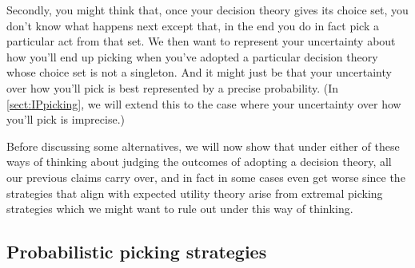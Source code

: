 \documentclass[a4paper]{article}
\newcommand\Exp{\mathsf{Exp}}
\newcommand\U{\mathfrak{U}} %
\newcommand{\n}{\mathsf{n}}
\newcommand{\todoold}[2][]{\todo[backgroundcolor=white,bordercolor=orange!10,linecolor=gray!10, #1,caption={},textcolor=gray]{Pre-rev: #2}}
\newenvironment{CCM rewritten}
{\begingroup\color{blue}} %
{\endgroup}              %
\begin{document}
Secondly, you might think that, once your decision theory gives its choice set, you don't know what happens next except that, in the end you do in fact pick a particular act from that set. We then want to represent your uncertainty about how you'll end up picking when you've adopted a particular decision theory whose choice set is not a singleton. And it might just be that your uncertainty over how you'll pick is best represented by a precise probability. (In \cref{sect:IPpicking}, we will extend this to the case where your uncertainty over how you'll pick is imprecise.)



Before discussing some alternatives, we will now show that under either of these ways of thinking about judging the outcomes of adopting a decision theory, all our previous claims carry over, and in fact in some cases even get worse since the strategies that align with expected utility theory arise from extremal picking strategies which we might want to rule out under this way of thinking. 






\subsection{Probabilistic picking strategies}
\end{document}
